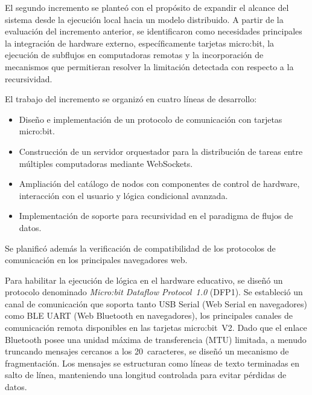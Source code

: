 
El segundo incremento se planteó con el propósito de expandir el alcance del sistema desde la ejecución local hacia un modelo distribuido. A partir de la evaluación del incremento anterior, se identificaron como necesidades principales la integración de hardware externo, específicamente tarjetas micro:bit, la ejecución de subflujos en computadoras remotas y la incorporación de mecanismos que permitieran resolver la limitación detectada con respecto a la recursividad.

El trabajo del incremento se organizó en cuatro líneas de desarrollo:

\begin{itemize}
    \item Diseño e implementación de un protocolo de comunicación con tarjetas micro:bit.
    \item Construcción de un servidor orquestador para la distribución de tareas entre múltiples computadoras mediante WebSockets.
    \item Ampliación del catálogo de nodos con componentes de control de hardware, interacción con el usuario y lógica condicional avanzada.
    \item Implementación de soporte para recursividad en el paradigma de flujos de datos.
\end{itemize}

Se planificó además la verificación de compatibilidad de los protocolos de comunicación en los principales navegadores web.

Para habilitar la ejecución de lógica en el hardware educativo, se diseñó un protocolo denominado \emph{Micro:bit Dataflow Protocol~1.0} (DFP1). Se estableció un canal de comunicación que soporta tanto USB Serial (Web Serial en navegadores) como BLE UART (Web Bluetooth en navegadores), los principales canales de comunicación remota disponibles en las tarjetas micro:bit~V2. Dado que el enlace Bluetooth posee una unidad máxima de transferencia (MTU) limitada, a menudo truncando mensajes cercanos a los 20~caracteres, se diseñó un mecanismo de fragmentación. Los mensajes se estructuran como líneas de texto terminadas en salto de línea, manteniendo una longitud controlada para evitar pérdidas de datos.

